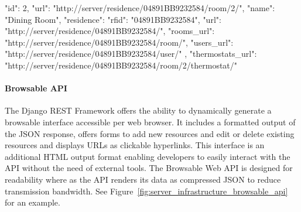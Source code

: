 \begin{snippet}[language=JavaScript,label={lst:room-json-example},caption={Example representation of the Room resource at \nolinkurl{http://server/residence/04891BB9232584/room/2/}.
		The \highlight{url} field determines the URL of the represented resource.
		Within the \highlight{residence} field the representation of the associated Residence resource is nested.
		The included Residence representation has its own \highlight{url} field.
		Collections of the Residence's Rooms and Users are not nested but referenced via URL to limit the response size.}]
	{
		"id": 2,
		"url": "http://server/residence/04891BB9232584/room/2/",
		"name": "Dining Room",
		"residence": {
			"rfid": "04891BB9232584",
			"url": "http://server/residence/04891BB9232584/",
			"rooms_url": "http://server/residence/04891BB9232584/room/",
			"users_url": "http://server/residence/04891BB9232584/user/"
		},
		"thermostats_url": "http://server/residence/04891BB9232584/room/2/thermostat/"
	}
\end{snippet}


\paragraph{Browsable API}

The Django REST Framework offers the ability to dynamically generate a browsable interface accessible per web browser.
It includes a formatted output of the JSON response, offers forms to add new resources and edit or delete existing resources and displays URLs as clickable hyperlinks.
This interface is an additional HTML output format enabling developers to easily interact with the API without the need of external tools.
The Browsable Web API is designed for readability where as the API renders its data as compressed JSON to reduce transmission bandwidth.
See Figure~\ref{fig:server_infrastructure_browsable_api} for an example.

